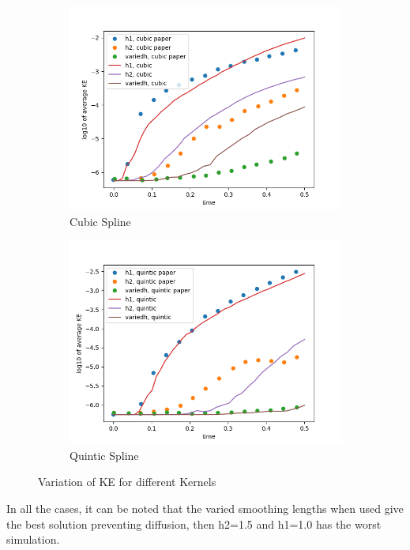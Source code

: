 \begin{figure}[H]
\centering
\begin{subfigure}[b]{0.45\textwidth}
\includegraphics[width=\linewidth]{./case13.png}
\caption{Cubic Spline}
\end{subfigure}
\begin{subfigure}[b]{0.45\textwidth}
\includegraphics[width=\linewidth]{./case14.png}
\caption{Quintic Spline}
\end{subfigure}
\caption{Variation of KE for different Kernels}
\end{figure}

In all the cases, it can be noted that the varied smoothing lengths when used give the best solution preventing diffusion, then h2=1.5 and h1=1.0 has the worst simulation. 

